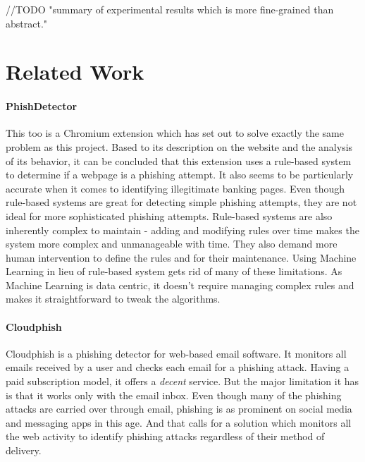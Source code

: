 \documentclass[conference]{IEEEtran}
\begin{document}
\par //TODO  "summary of experimental results which is more fine-grained than abstract."

\section{Related Work}
\paragraph{PhishDetector\cite{PhishDetector}}
This too is a Chromium extension which has set out to solve exactly the same problem as this project.
Based to its description on the website and the analysis of its behavior, it can be concluded that this extension uses a rule-based system to determine if a webpage is a phishing attempt.
It also seems to be particularly accurate when it comes to identifying illegitimate banking pages.
Even though rule-based systems are great for detecting simple phishing attempts, they are not ideal for more sophisticated phishing attempts.
Rule-based systems are also inherently complex to maintain - adding and modifying rules over time makes the system more complex and unmanageable with time.
They also demand more human intervention to define the rules and for their maintenance.
Using Machine Learning in lieu of rule-based system gets rid of many of these limitations.
As Machine Learning is data centric, it doesn't require managing complex rules and makes it straightforward to tweak the algorithms.

\paragraph{Cloudphish\cite{Cloudphish}}
Cloudphish is a phishing detector for web-based email software.
It monitors all emails received by a user and checks each email for a phishing attack.
Having a paid subscription model, it offers a \emph{decent} service.
But the major limitation it has is that it works only with the email inbox.
Even though many of the phishing attacks are carried over through email, phishing is as prominent on social media and messaging apps in this age.
And that calls for a solution which monitors all the web activity to identify phishing attacks regardless of their method of delivery.
\end{document}
